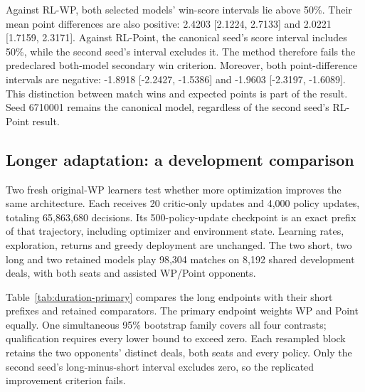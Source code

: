 \begin{table}[ht]
\centering\small

\caption{Frozen final results. Each row contains 10,000 duplicate pairs;
all rows share deal seeds. WP and Point denote assisted RL-WP and RL-Point.}
\label{tab:final}
\end{table}

Against RL-WP, both selected models' win-score intervals lie above 50\%.
Their mean point differences are also positive: 2.4203 [2.1224, 2.7133]
and 2.0221 [1.7159, 2.3171]. Against RL-Point, the canonical seed's score
interval includes 50\%, while the second seed's interval excludes it.
The method therefore fails the predeclared both-model secondary win criterion.
Moreover, both point-difference intervals are negative: -1.8918
[-2.2427, -1.5386] and -1.9603 [-2.3197, -1.6089]. This distinction between
match wins and expected points is part of the result. Seed 6710001 remains
the canonical model, regardless of the second seed's RL-Point result.

\subsection{Longer adaptation: a development comparison}
\label{sec:duration}
Two fresh original-WP learners test whether more optimization improves the
same architecture. Each receives 20 critic-only updates and 4,000 policy
updates, totaling 65,863,680 decisions. Its 500-policy-update checkpoint is an
exact prefix of that trajectory, including optimizer and environment state.
Learning rates, exploration, returns and greedy deployment are unchanged.
The two short, two long and two retained models play 98,304 matches on 8,192
shared development deals, with both seats and assisted WP/Point opponents.

Table~\ref{tab:duration-primary} compares the long endpoints with their short
prefixes and retained comparators. The primary endpoint weights WP and Point
equally. One simultaneous 95\% bootstrap family covers all four contrasts;
qualification requires every lower bound to exceed zero. Each resampled block
retains the two opponents' distinct deals, both seats and every policy.
Only the second seed's long-minus-short interval excludes zero, so the
replicated improvement criterion fails.

\begin{table}[htbp]
\centering\small

\caption{Longer-training development win changes in percentage points.
Intervals are simultaneous across these four comparisons; 10,000 bootstrap
replicates resample 4,096 compound blocks.}
\label{tab:duration-primary}
\end{table}

